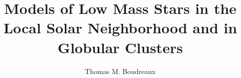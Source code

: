 \documentclass[a4paper]{article}
\title{Models of Low Mass Stars in the Local Solar Neighborhood and in Globular Clusters}
\author{Thomas M. Boudreaux}
\begin{document}
\maketitle


\begin{abstract}
	
\end{abstract}
\end{document}
